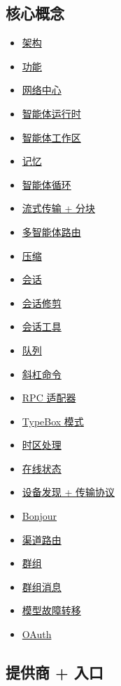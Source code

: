 \subsection{核心概念}


\begin{itemize}
  \item \href{/concepts/architecture}{架构}
  \item \href{/concepts/features}{功能}
  \item \href{/network}{网络中心}
  \item \href{/concepts/agent}{智能体运行时}
  \item \href{/concepts/agent-workspace}{智能体工作区}
  \item \href{/concepts/memory}{记忆}
  \item \href{/concepts/agent-loop}{智能体循环}
  \item \href{/concepts/streaming}{流式传输 + 分块}
  \item \href{/concepts/multi-agent}{多智能体路由}
  \item \href{/concepts/compaction}{压缩}
  \item \href{/concepts/session}{会话}
  \item \href{/concepts/session-pruning}{会话修剪}
  \item \href{/concepts/session-tool}{会话工具}
  \item \href{/concepts/queue}{队列}
  \item \href{/tools/slash-commands}{斜杠命令}
  \item \href{/reference/rpc}{RPC 适配器}
  \item \href{/concepts/typebox}{TypeBox 模式}
  \item \href{/concepts/timezone}{时区处理}
  \item \href{/concepts/presence}{在线状态}
  \item \href{/gateway/discovery}{设备发现 + 传输协议}
  \item \href{/gateway/bonjour}{Bonjour}
  \item \href{/channels/channel-routing}{渠道路由}
  \item \href{/channels/groups}{群组}
  \item \href{/channels/group-messages}{群组消息}
  \item \href{/concepts/model-failover}{模型故障转移}
  \item \href{/concepts/oauth}{OAuth}
\end{itemize}


\subsection{提供商 + 入口}


